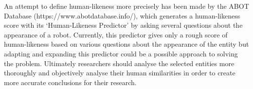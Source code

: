 An attempt to define human-likeness more precisely has been made by the ABOT Database (https://www.abotdatabase.info/), which generates a human-likeness score with its `Human-Likeness Predictor' by asking several questions about the appearance of a robot.
Currently, this predictor gives only a rough score of human-likeness based on various questions about the appearance of the entity but adapting and expanding this predictor could be a possible approach to solving the problem. Ultimately researchers should analyse the selected entities more thoroughly and objectively analyse their human similarities in order to create more accurate conclusions for their research.

\clearpage
\newpage

